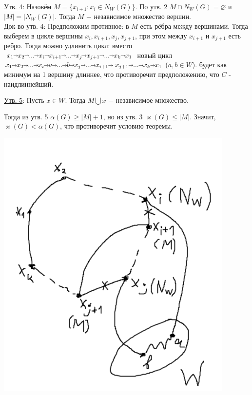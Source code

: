 \underline{Утв. 4}: Назовём $M=\{x_{i+1}: x_i \in N_W(G) \}$. По утв. 2 \newline
$M \cap N_W(G) = \varnothing$ и $|M|=|N_W(G)|$. Тогда $M$ $-$ независимое множество вершин. \\
Док-во утв. 4: Предположим противное: в $M$ есть рёбра между вершинами. Тогда выберем в цикле вершины $x_i, x_{i+1}, x_j, x_{j+1}$, при этом между $x_{i+1}$ и $x_{j+1}$ есть ребро.
Тогда можно удлинить цикл: вместо $x_1\!\! \shortrightarrow\!\! x_2\!\! \shortrightarrow\!\! ...\!\! \shortrightarrow\!\! x_i\!\! \shortrightarrow\!\! x_{i+1}\!\! \shortrightarrow\!\! ...\!\! \shortrightarrow\!\! x_j\!\! \shortrightarrow\!\! x_{j+1}\!\! \shortrightarrow\!\! ...\!\! \shortrightarrow\!\! x_k\!\! \shortrightarrow\!\! x_1$ новый цикл $x_1\!\! \shortrightarrow\!\! x_2\!\! \shortrightarrow\!\! ...\!\! \shortrightarrow\!\! x_i\!\! \shortrightarrow\!\! a\!\! \shortrightarrow\!\! ...\!\! \shortrightarrow\!\! b\!\! \shortrightarrow\!\! x_j\!\! \shortrightarrow\!\! ...\!\! \shortrightarrow\!\! x_{i+1}\!\! \shortrightarrow x_{j+1}\!\! \shortrightarrow\!\! ...\!\! \shortrightarrow\!\! x_k\!\! \shortrightarrow\!\! x_1$ ($a, b \in W$). будет как минимум на 1 вершину длиннее, что противоречит предположению, что $C$ - наидлиннейший.

\underline{Утв. 5}: Пусть $x \in W$. Тогда $M \bigcup {x}$ $-$ независимое множество.

Тогда из утв. 5 $\alpha(G) \geqslant |M|+1$, но из утв. 3 $\varkappa(G) \leqslant |M|$. Значит, $\varkappa(G) < \alpha(G)$, что противоречит условию теоремы. \EndProof
\begin{center}
    \includegraphics[scale = 0.40]{images/E-H_cycle_lengthening.png}
\end{center}